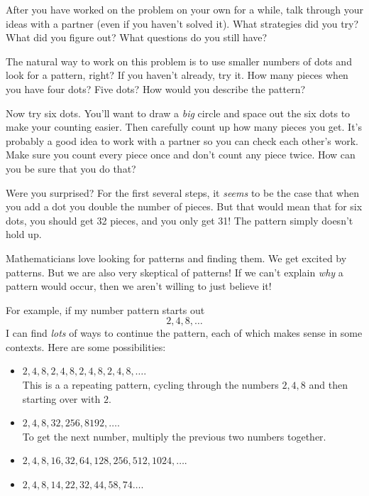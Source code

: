 \begin{thinkpair*}
After you have worked on the problem on your own for a while, talk through your ideas with a partner (even if you haven't solved it).  What strategies did you try?   What did you figure out?  What questions do you still have?
\end{thinkpair*}


The natural way to work on this problem is to use smaller numbers of dots and look for a pattern, right?  If you haven't already, try it.  How many pieces when you have four dots?  Five dots?   How would you describe the pattern?

Now try six dots.  You'll want to draw a \emph{big} circle and space out the six dots to make your counting easier.  Then carefully count up how many pieces you get.  It's probably a good idea to work with a partner so you can check each other's work.  Make sure you count every piece once and don't count any piece twice.  How can you be sure that you do that?

Were you surprised?  For the first several steps, it  \emph{seems} to be the case that when you add a dot you double the number of pieces.  But that would mean that for six dots, you should get 32 pieces, and you only get 31!  The pattern simply doesn't hold up.


Mathematicians love looking for patterns and finding them.  We get excited by patterns.   But we are also very skeptical of patterns!  If we can't explain \emph{why} a pattern would occur, then we aren't willing to just believe it!  

For example, if my number pattern starts out 
\[
2, 4, 8, \dots
\]
I can find \emph{lots} of ways to continue the pattern, each of which makes sense in some contexts.  Here are some possibilities:
\begin{itemize}
\item
$2, 4, 8, 2, 4, 8, 2, 4, 8, 2, 4, 8, \dots$. \\
This is a a repeating pattern, cycling through the numbers $2, 4, 8$ and then starting over with $2$.\\

\item
$2, 4, 8, 32, 256, 8192,  \dots$. \\
To get the next number, multiply the previous two numbers together.\\

\item
$2, 4, 8, 16, 32, 64, 128, 256, 512, 1024,  \dots$. \\

\item
$2, 4, 8, 14, 22, 32, 44, 58, 74  \dots$. \\

\end{itemize}


